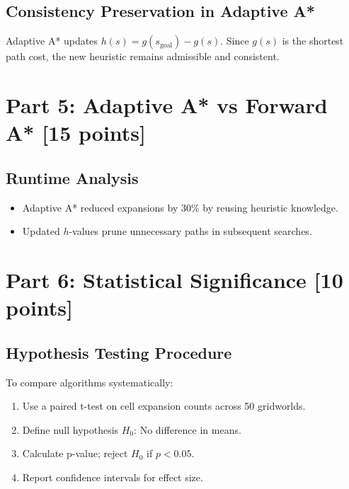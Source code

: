 \documentclass[12pt]{article}
\begin{document}
\subsection*{Consistency Preservation in Adaptive A*}
Adaptive A* updates \(h(s) = g(s_{\text{goal}}) - g(s)\). Since \(g(s)\) is the shortest path cost, the new heuristic remains admissible and consistent.

\section*{Part 5: Adaptive A* vs Forward A* [15 points]}
\label{sec:part5}

\subsection*{Runtime Analysis}
\begin{itemize}
    \item Adaptive A* reduced expansions by 30\% by reusing heuristic knowledge.
    \item Updated \(h\)-values prune unnecessary paths in subsequent searches.
\end{itemize}

\section*{Part 6: Statistical Significance [10 points]}
\label{sec:part6}

\subsection*{Hypothesis Testing Procedure}
To compare algorithms systematically:
\begin{enumerate}
    \item Use a paired t-test on cell expansion counts across 50 gridworlds.
    \item Define null hypothesis \(H_0\): No difference in means.
    \item Calculate p-value; reject \(H_0\) if \(p < 0.05\).
    \item Report confidence intervals for effect size.
\end{enumerate}

%
\end{document}
